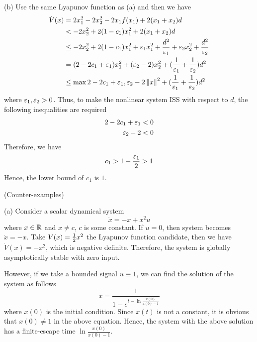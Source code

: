 \documentclass[a4 paper, 12pt]{article}
\begin{document}
(b) Use the same Lyapunov function as (a) and then we have
\begin{equation}
        \begin{aligned}
                \dot{V}(x) &= 2x_1^2 -2x_2^2 -2x_1f(x_1) + 2(x_1+x_2)d \\
                &< -2x_2^2 + 2(1-c_1)x_1^2 + 2(x_1+x_2)d \\
                &\leq -2x_2^2 + 2(1-c_1)x_1^2 + \varepsilon_1 x_1^2 + \frac{d^2}{\varepsilon_1} + \varepsilon_2 x_2^2 + \frac{d^2}{\varepsilon_2} \\
                &= (2-2c_1+\varepsilon_1)x_1^2 + (\varepsilon_2-2)x_2^2 + (\frac{1}{\varepsilon_1}+\frac{1}{\varepsilon_2})d^2 \\
                &\leq \max{2-2c_1+\varepsilon_1, \varepsilon_2-2}\left\|x\right\|^2 + (\frac{1}{\varepsilon_1}+\frac{1}{\varepsilon_2})d^2
        \end{aligned}
\end{equation}
where $\varepsilon_1, \varepsilon_2 >0$.
Thus, to make the nonlinear system ISS with respect to $d$, the following inequalities are required
\begin{align}
        2-2c_1+\varepsilon_1 < 0 \\
        \varepsilon_2-2 < 0
\end{align}
Therefore, we have
\begin{equation}
        c_1 > 1+\frac{\varepsilon_1}{2} > 1
\end{equation}
Hence, the lower bound of $c_1$ is $1$.


 (Counter-examples)

 (a) Consider a scalar dynamical system
\begin{equation}
        \dot{x} = -x + x^2u
\end{equation}
where $x\in\mathbb{R}$ and $x\neq c$, $c$ is some constant. If $u=0$, then system becomes $\dot{x} = -x$. Take $V(x) = \frac{1}{2} x^2$ the Lyapunov function candidate, then we have $\dot{V}(x)=-x^2$, which is negative definite. Therefore, the system is globally asymptotically stable with zero input.

However, if we take a bounded signal $u \equiv 1$, we can find the solution of the system as follows
\begin{equation}
        x = \frac{1}{1-e^{t-\ln{\frac{x(0)}{x(0)-1}}}}
\end{equation}
where $x(0)$ is the initial condition. Since $x(t)$ is not a constant, it is obvious that $x(0) \neq 1$ in the above equation. Hence, the system with the above solution has a finite-escape time $\ln{\frac{x(0)}{x(0)-1}}$.
\end{document}
